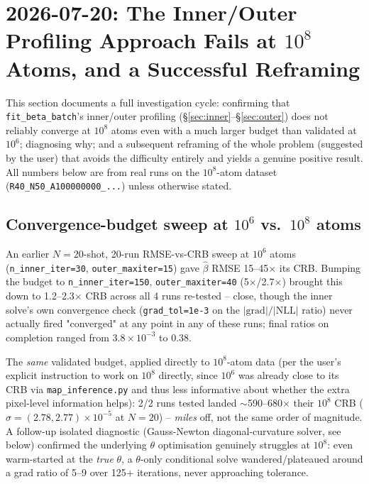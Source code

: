 \documentclass[11pt,a4paper]{article}
\newcommand{\code}[1]{\texttt{#1}}
\begin{document}
\section{2026-07-20: The Inner/Outer Profiling Approach Fails at $10^8$
Atoms, and a Successful Reframing}
\label{sec:2026-07-20}

This section documents a full investigation cycle: confirming that
\code{fit\_beta\_batch}'s inner/outer profiling (\S\ref{sec:inner}--\S\ref{sec:outer})
does not reliably converge at $10^8$ atoms even with a much larger budget
than validated at $10^6$; diagnosing why; and a subsequent reframing of the
whole problem (suggested by the user) that avoids the difficulty entirely
and yields a genuine positive result. All numbers below are from real runs
on the $10^8$-atom dataset (\code{R40\_N50\_A100000000\_...}) unless
otherwise stated.

\subsection{Convergence-budget sweep at $10^6$ vs.\ $10^8$ atoms}
\label{sec:2026-07-20-budget}

An earlier $N=20$-shot, 20-run RMSE-vs-CRB sweep at $10^6$ atoms
(\code{n\_inner\_iter=30}, \code{outer\_maxiter=15}) gave $\hat\beta$ RMSE
15--45$\times$ its CRB. Bumping the budget to \code{n\_inner\_iter=150},
\code{outer\_maxiter=40} (5$\times$/2.7$\times$) brought this down to
1.2--2.3$\times$ CRB across all 4 runs re-tested -- close, though the inner
solve's own convergence check (\code{grad\_tol=1e-3} on the
$|\text{grad}|/|\text{NLL}|$ ratio) never actually fired "converged" at any
point in any of these runs; final ratios on completion ranged from
$3.8\times10^{-3}$ to $0.38$.

The \emph{same} validated budget, applied directly to $10^8$-atom data (per
the user's explicit instruction to work on $10^8$ directly, since $10^6$
was already close to its CRB via \code{map\_inference.py} and thus less
informative about whether the extra pixel-level information helps): 2/2
runs tested landed $\sim$590--680$\times$ their $10^8$ CRB
($\sigma=(2.78,2.77)\times10^{-5}$ at $N=20$) -- \emph{miles} off, not the
same order of magnitude. A follow-up isolated diagnostic (Gauss-Newton
diagonal-curvature solver, see below) confirmed the underlying $\theta$
optimisation genuinely struggles at $10^8$: even warm-started at the
\emph{true} $\theta$, a $\theta$-only conditional solve wandered/plateaued
around a grad ratio of 5--9 over 125+ iterations, never approaching
tolerance.
\end{document}
